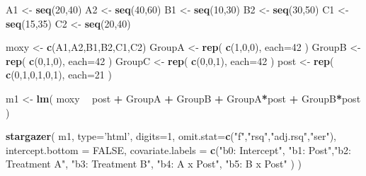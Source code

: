 \documentclass[]{book}
\newenvironment{Shaded}{\begin{snugshade}}{\end{snugshade}}
\newcommand{\DataTypeTok}[1]{\textcolor[rgb]{0.13,0.29,0.53}{#1}}
\newcommand{\DecValTok}[1]{\textcolor[rgb]{0.00,0.00,0.81}{#1}}
\newcommand{\KeywordTok}[1]{\textcolor[rgb]{0.13,0.29,0.53}{\textbf{#1}}}
\newcommand{\NormalTok}[1]{#1}
\newcommand{\OperatorTok}[1]{\textcolor[rgb]{0.81,0.36,0.00}{\textbf{#1}}}
\newcommand{\OtherTok}[1]{\textcolor[rgb]{0.56,0.35,0.01}{#1}}
\newcommand{\StringTok}[1]{\textcolor[rgb]{0.31,0.60,0.02}{#1}}
\theoremstyle{definition}
\theoremstyle{definition}
\theoremstyle{definition}
\theoremstyle{remark}
\begin{document}
\begin{Shaded}
\begin{Highlighting}[]

      
\NormalTok{A1 <-}\StringTok{ }\KeywordTok{seq}\NormalTok{(}\DecValTok{20}\NormalTok{,}\DecValTok{40}\NormalTok{)}
\NormalTok{A2 <-}\StringTok{ }\KeywordTok{seq}\NormalTok{(}\DecValTok{40}\NormalTok{,}\DecValTok{60}\NormalTok{)}
\NormalTok{B1 <-}\StringTok{ }\KeywordTok{seq}\NormalTok{(}\DecValTok{10}\NormalTok{,}\DecValTok{30}\NormalTok{)}
\NormalTok{B2 <-}\StringTok{ }\KeywordTok{seq}\NormalTok{(}\DecValTok{30}\NormalTok{,}\DecValTok{50}\NormalTok{)}
\NormalTok{C1 <-}\StringTok{ }\KeywordTok{seq}\NormalTok{(}\DecValTok{15}\NormalTok{,}\DecValTok{35}\NormalTok{)}
\NormalTok{C2 <-}\StringTok{ }\KeywordTok{seq}\NormalTok{(}\DecValTok{20}\NormalTok{,}\DecValTok{40}\NormalTok{)}


\NormalTok{moxy <-}\StringTok{ }\KeywordTok{c}\NormalTok{(A1,A2,B1,B2,C1,C2)}
\NormalTok{GroupA <-}\StringTok{ }\KeywordTok{rep}\NormalTok{( }\KeywordTok{c}\NormalTok{(}\DecValTok{1}\NormalTok{,}\DecValTok{0}\NormalTok{,}\DecValTok{0}\NormalTok{), }\DataTypeTok{each=}\DecValTok{42}\NormalTok{ )}
\NormalTok{GroupB <-}\StringTok{ }\KeywordTok{rep}\NormalTok{( }\KeywordTok{c}\NormalTok{(}\DecValTok{0}\NormalTok{,}\DecValTok{1}\NormalTok{,}\DecValTok{0}\NormalTok{), }\DataTypeTok{each=}\DecValTok{42}\NormalTok{ )}
\NormalTok{GroupC <-}\StringTok{ }\KeywordTok{rep}\NormalTok{( }\KeywordTok{c}\NormalTok{(}\DecValTok{0}\NormalTok{,}\DecValTok{0}\NormalTok{,}\DecValTok{1}\NormalTok{), }\DataTypeTok{each=}\DecValTok{42}\NormalTok{ )}
\NormalTok{post <-}\StringTok{ }\KeywordTok{rep}\NormalTok{( }\KeywordTok{c}\NormalTok{(}\DecValTok{0}\NormalTok{,}\DecValTok{1}\NormalTok{,}\DecValTok{0}\NormalTok{,}\DecValTok{1}\NormalTok{,}\DecValTok{0}\NormalTok{,}\DecValTok{1}\NormalTok{), }\DataTypeTok{each=}\DecValTok{21}\NormalTok{ )}


\NormalTok{m1 <-}\StringTok{ }\KeywordTok{lm}\NormalTok{( moxy }\OperatorTok{~}\StringTok{ }\NormalTok{post }\OperatorTok{+}\StringTok{ }\NormalTok{GroupA }\OperatorTok{+}\StringTok{ }\NormalTok{GroupB  }\OperatorTok{+}\StringTok{ }\NormalTok{GroupA}\OperatorTok{*}\NormalTok{post }\OperatorTok{+}\StringTok{ }\NormalTok{GroupB}\OperatorTok{*}\NormalTok{post )}



\KeywordTok{stargazer}\NormalTok{( m1, }\DataTypeTok{type=}\StringTok{'html'}\NormalTok{, }\DataTypeTok{digits=}\DecValTok{1}\NormalTok{,}
           \DataTypeTok{omit.stat=}\KeywordTok{c}\NormalTok{(}\StringTok{"f"}\NormalTok{,}\StringTok{"rsq"}\NormalTok{,}\StringTok{"adj.rsq"}\NormalTok{,}\StringTok{"ser"}\NormalTok{),}
           \DataTypeTok{intercept.bottom =} \OtherTok{FALSE}\NormalTok{,}
           \DataTypeTok{covariate.labels =} \KeywordTok{c}\NormalTok{(}\StringTok{"b0: Intercept"}\NormalTok{, }\StringTok{"b1: Post"}\NormalTok{,}\StringTok{"b2: Treatment A"}\NormalTok{,}
                                \StringTok{"b3: Treatment B"}\NormalTok{, }\StringTok{"b4: A x Post"}\NormalTok{, }\StringTok{"b5: B x Post"}\NormalTok{ ) )}
\end{Highlighting}
\end{Shaded}
\end{document}
